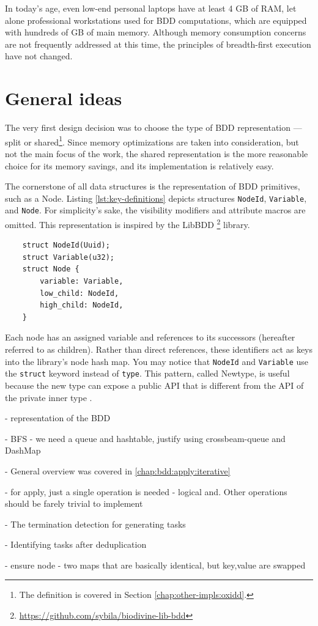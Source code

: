 In today's age, even low-end personal laptops have at least 4 GB of RAM, let alone professional workstations used for
BDD computations, which are equipped with hundreds of GB of main memory. Although memory consumption concerns are not
frequently addressed at this time, the principles of breadth-first execution have not changed.


\section{General ideas}
\label{chap:design:general}

The very first design decision was to choose the type of BDD representation --- split or shared\footnote{The
definition is covered in Section \ref{chap:other-impls:oxidd}.}. Since memory optimizations are taken into
consideration, but not the main focus of the work, the shared representation is the more reasonable choice for its
memory savings, and its implementation is relatively easy.

The cornerstone of all data structures is the representation of BDD primitives, such as a Node. Listing
\ref{lst:key-definitions} depicts structures \texttt{NodeId}, \texttt{Variable}, and \texttt{Node}. For simplicity's
sake, the visibility modifiers and attribute macros are omitted. This representation is inspired by the LibBDD
\footnote{\url{https://github.com/sybila/biodivine-lib-bdd}} library.

\begin{listing}[htbp]
    \caption{Definitions of the key types --- \texttt{NodeId}, \texttt{Variable}, and \texttt{Node}.}
    \label{lst:key-definitions}
    \begin{verbatim}
    struct NodeId(Uuid);
    struct Variable(u32);
    struct Node {
        variable: Variable,
        low_child: NodeId,
        high_child: NodeId,
    }
    \end{verbatim}
\end{listing}

Each node has an assigned variable and references to its successors (hereafter referred to as children). Rather than
direct references, these identifiers act as keys into the library's node hash map. You may notice that
\texttt{NodeId} and \texttt{Variable} use the \texttt{struct} keyword instead of \texttt{type}. This pattern,
called Newtype, is useful because the new type can expose a public API that is different from the API of the
private inner type \cite[ch. 20]{rust-book}.

- representation of the BDD

- BFS - we need a queue and hashtable, justify using crossbeam-queue and DashMap

- General overview was covered in \ref{chap:bdd:apply:iterative}

- for apply, just a single operation is needed - logical and. Other operations should be farely trivial to implement

- The termination detection for generating tasks

- Identifying tasks after deduplication

- ensure node - two maps that are basically identical, but key,value are swapped

